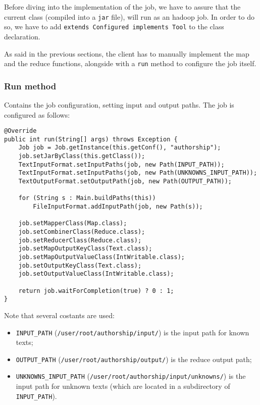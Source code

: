 \documentclass[a4paper,11pt, twoside]{article}
\begin{document}
	Before diving into the implementation of the job, we have to assure that the current class (compiled into a \verb|jar| file), will run as an hadoop job. In order to do so, we have to add \lstinline|extends Configured implements Tool| to the class declaration.
	
	\bigskip
	\noindent
	As said in the previous sections, the client has to manually implement the map and the reduce functions, alongside with a \lstinline|run| method to configure the job itself.

	\subsubsection{Run method}
	Contains the job configuration, setting input and output paths.
	The job is configured as follows:
	
	\begin{lstlisting}[firstnumber=45, caption={Run method}, captionpos=b]
@Override
public int run(String[] args) throws Exception {
	Job job = Job.getInstance(this.getConf(), "authorship");
	job.setJarByClass(this.getClass());
	TextInputFormat.setInputPaths(job, new Path(INPUT_PATH));
	TextInputFormat.setInputPaths(job, new Path(UNKNOWNS_INPUT_PATH));
	TextOutputFormat.setOutputPath(job, new Path(OUTPUT_PATH));
	
	for (String s : Main.buildPaths(this))
		FileInputFormat.addInputPath(job, new Path(s));
	
	job.setMapperClass(Map.class);
	job.setCombinerClass(Reduce.class);
	job.setReducerClass(Reduce.class);
	job.setMapOutputKeyClass(Text.class);
	job.setMapOutputValueClass(IntWritable.class);
	job.setOutputKeyClass(Text.class);
	job.setOutputValueClass(IntWritable.class);
	
	return job.waitForCompletion(true) ? 0 : 1;
}
	\end{lstlisting}
	
	Note that several costants are used: \begin{itemize}
		\item \lstinline|INPUT_PATH| (\lstinline|/user/root/authorship/input/|) is the input path for known texts;
		\item \lstinline|OUTPUT_PATH| (\lstinline|/user/root/authorship/output/|) is the reduce output path;
		\item \lstinline|UNKNOWNS_INPUT_PATH| (\lstinline|/user/root/authorship/input/unknowns/|) is the input path for unknown texts (which are located in a subdirectory of \lstinline|INPUT_PATH|).
	\end{itemize}
\end{document}
